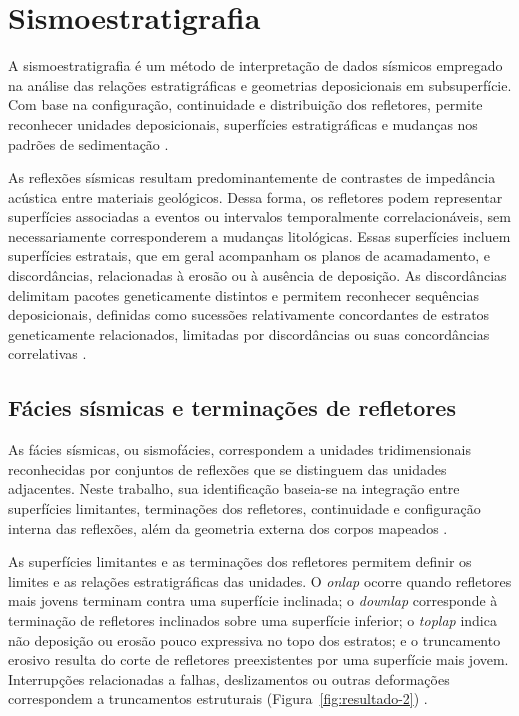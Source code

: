\section{Sismoestratigrafia}\label{sec:2-2}

A sismoestratigrafia é um método de interpretação de dados sísmicos empregado na análise das relações estratigráficas e geometrias deposicionais em subsuperfície. Com base na configuração, continuidade e distribuição dos refletores, permite reconhecer unidades deposicionais, superfícies estratigráficas e mudanças nos padrões de sedimentação \cite{severianoribeiro2001}.

As reflexões sísmicas resultam predominantemente de contrastes de impedância acústica entre materiais geológicos. Dessa forma, os refletores podem representar superfícies associadas a eventos ou intervalos temporalmente correlacionáveis, sem necessariamente corresponderem a mudanças litológicas. Essas superfícies incluem superfícies estratais, que em geral acompanham os planos de acamadamento, e discordâncias, relacionadas à erosão ou à ausência de deposição. As discordâncias delimitam pacotes geneticamente distintos e permitem reconhecer sequências deposicionais, definidas como sucessões relativamente concordantes de estratos geneticamente relacionados, limitadas por discordâncias ou suas concordâncias correlativas \cite{severianoribeiro2001,vail1977,mitchum1977}.

\subsection{Fácies sísmicas e terminações de refletores}\label{sec:2-2-1}

As fácies sísmicas, ou sismofácies, correspondem a unidades tridimensionais reconhecidas por conjuntos de reflexões que se distinguem das unidades adjacentes. Neste trabalho, sua identificação baseia-se na integração entre superfícies limitantes, terminações dos refletores, continuidade e configuração interna das reflexões, além da geometria externa dos corpos mapeados \cite{brownfisher1980}.

As superfícies limitantes e as terminações dos refletores permitem definir os limites e as relações estratigráficas das unidades. O \textit{onlap} ocorre quando refletores mais jovens terminam contra uma superfície inclinada; o \textit{downlap} corresponde à terminação de refletores inclinados sobre uma superfície inferior; o \textit{toplap} indica não deposição ou erosão pouco expressiva no topo dos estratos; e o truncamento erosivo resulta do corte de refletores preexistentes por uma superfície mais jovem. Interrupções relacionadas a falhas, deslizamentos ou outras deformações correspondem a truncamentos estruturais (Figura~\ref{fig:resultado-2}) \cite{vail1977,mitchum1977}.

